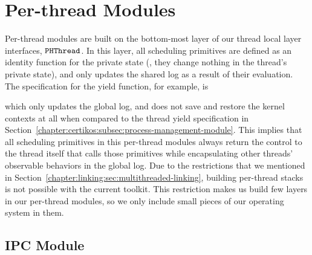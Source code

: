 \section{Per-thread Modules}
\label{chapter:certikos:sec:per-thread-modules}

Per-thread modules are built on
the bottom-most layer of our thread local layer interfaces, ${\mathrm{\texttt{PHThread}}}$. 
In this layer, all scheduling primitives are defined as an identity function for the private state (\ie, they change nothing in the thread's private state),
and only updates the shared log as a result of their evaluation. 
The specification for the  yield function, for example, is

which only updates the global log, and does not save and restore the kernel contexts at all when compared to the thread yield specification 
in Section~\ref{chapter:certikos:subsec:process-management-module}.
This implies that all scheduling primitives in this per-thread modules always return the control to the thread itself that calls those primitives while
encapsulating other threads' observable behaviors in the global log.
Due to the restrictions that we mentioned in Section~\ref{chapter:linking:sec:multithreaded-linking},
building per-thread stacks is not possible with the current toolkit. 
This restriction makes us build few layers in our per-thread modules,
so we only include small pieces of our operating system in them.


\subsection{IPC Module}
\label{chapter:certikos:subsec:ipc-module}

